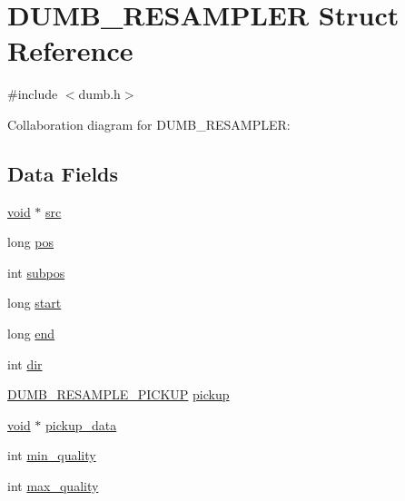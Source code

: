 \hypertarget{struct_d_u_m_b___r_e_s_a_m_p_l_e_r}{}\section{D\+U\+M\+B\+\_\+\+R\+E\+S\+A\+M\+P\+L\+ER Struct Reference}
\label{struct_d_u_m_b___r_e_s_a_m_p_l_e_r}


{\ttfamily \#include $<$dumb.\+h$>$}



Collaboration diagram for D\+U\+M\+B\+\_\+\+R\+E\+S\+A\+M\+P\+L\+ER\+:
\subsection*{Data Fields}
\begin{DoxyCompactItemize}
\item 
\hyperlink{png_8h_ac9c84fa68bbad002983e35ce3663c686}{void} $\ast$ \hyperlink{struct_d_u_m_b___r_e_s_a_m_p_l_e_r_a374752b2366e23ba5189561cd696b3e2}{src}
\item 
long \hyperlink{struct_d_u_m_b___r_e_s_a_m_p_l_e_r_a63d2b3ca906566384cd55fd52c9d3e69}{pos}
\item 
int \hyperlink{struct_d_u_m_b___r_e_s_a_m_p_l_e_r_a69d3da6c598c1d632c36d861e99458e6}{subpos}
\item 
long \hyperlink{struct_d_u_m_b___r_e_s_a_m_p_l_e_r_aa0b4dbc1cb4459165a71c9aa76e307e1}{start}
\item 
long \hyperlink{struct_d_u_m_b___r_e_s_a_m_p_l_e_r_ab8e166eb7dfc8dbdbcf8e1ae036f8095}{end}
\item 
int \hyperlink{struct_d_u_m_b___r_e_s_a_m_p_l_e_r_a51666dc358e5923700e6ce055b3869e7}{dir}
\item 
\hyperlink{dumb_8h_aca58cdb0ac0c50cdd83e6d239161ffd0}{D\+U\+M\+B\+\_\+\+R\+E\+S\+A\+M\+P\+L\+E\+\_\+\+P\+I\+C\+K\+UP} \hyperlink{struct_d_u_m_b___r_e_s_a_m_p_l_e_r_ad411d1dbbe2900306e3c357bbabe7f15}{pickup}
\item 
\hyperlink{png_8h_ac9c84fa68bbad002983e35ce3663c686}{void} $\ast$ \hyperlink{struct_d_u_m_b___r_e_s_a_m_p_l_e_r_aae3464b0bf40395b6fc4bebcc5e7859d}{pickup\+\_\+data}
\item 
int \hyperlink{struct_d_u_m_b___r_e_s_a_m_p_l_e_r_a16aa7998d98e06f99f2d1304e3c78b37}{min\+\_\+quality}
\item 
int \hyperlink{struct_d_u_m_b___r_e_s_a_m_p_l_e_r_a830ce46ec4d6cdce34249b720749e98e}{max\+\_\+quality}
\item 

\end{DoxyCompactItemize}
